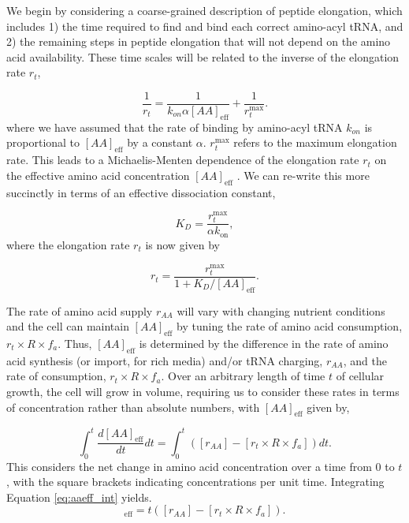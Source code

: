 We begin by considering a coarse-grained description of peptide elongation,
which includes 1) the time required to find and bind each correct amino-acyl
tRNA, and 2) the remaining steps in peptide elongation that will not depend on
the amino acid availability. These time scales will be related to the inverse of the
elongation rate $r_t$,

\begin{equation}
\frac{1}{r_t} = \frac{1}{k_{on} \alpha [AA]_{\text{eff}}} + \frac{1}{r_{t}^{\text{max}}}.
\end{equation}
where we have assumed that the rate of binding by amino-acyl tRNA $k_{on}$ is
proportional to $[AA]_{\text{eff}}$ by a constant $\alpha$. $r_{t}^{\text{max}}$
refers to the maximum elongation rate. This leads to a Michaelis-Menten
dependence of the elongation rate $r_t$ on the effective amino acid
concentration $[AA]_{\text{eff}}$ \citep{klumpp2013, dai2016}.
We can re-write this more succinctly in terms of an effective dissociation
constant,

\begin{equation}
    K_D = \frac{r_{t}^{\text{max}}}{\alpha k_\text{on}},
\end{equation}
where the elongation rate $r_t$ is now given by

\begin{equation}
r_t = \frac{r_{t}^{\text{max}}}{1 + K_D/[AA]_{\text{eff}}}.
\label{eq:rt_kd_simple}
\end{equation}

The rate of amino acid supply $r_{AA}$ will vary with changing nutrient
conditions and the cell can maintain $[AA]_{\text{eff}}$ by tuning the rate of
amino acid consumption, $r_t \times R \times f_a$.  Thus, $[AA]_{\text{eff}}$ is
determined by the difference in the rate of amino acid synthesis (or import, for
rich media) and/or tRNA charging,  $r_{AA}$, and the rate of consumption,
$r_t\times R \times f_a$. Over an  arbitrary length of time $t$ of cellular
growth, the cell will grow in volume, requiring us to consider these rates in
terms of concentration rather than absolute numbers, with $[AA]_{\text{eff}}$
given by,

\begin{equation}
\int_{0}^{t} \frac{d[AA]_{\text{eff}}}{dt} dt =  \int_{0}^{t}([r_{AA}] - [r_t\times R \times f_a]) dt.
\label{eq:aaeff_int}
\end{equation}
This considers the net change in amino acid concentration over a time from 0 to
$t$, with the square brackets indicating concentrations per unit time.
Integrating Equation \ref{eq:aaeff_int} yields.
\begin{equation}
[AA]_{\text{eff}} =  t([r_{AA}] - [r_t \times R \times f_a]).
\label{eq:aaeff_concs}
\end{equation}

